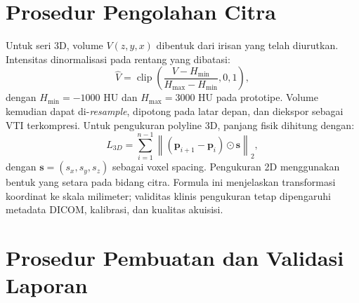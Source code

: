 \documentclass[12pt,a4paper,oneside]{report}
\begin{document}
\section{Prosedur Pengolahan Citra}

Untuk seri 3D, volume $V(z,y,x)$ dibentuk dari irisan yang telah diurutkan. Intensitas dinormalisasi pada rentang yang dibatasi:
\begin{equation}
\hat{V}=\operatorname{clip}\left(\frac{V-H_{\min}}{H_{\max}-H_{\min}},0,1\right),
\end{equation}
dengan $H_{\min}=-1000$ HU dan $H_{\max}=3000$ HU pada prototipe. Volume kemudian dapat di-\textit{resample}, dipotong pada latar depan, dan diekspor sebagai VTI terkompresi. Untuk pengukuran polyline 3D, panjang fisik dihitung dengan:
\begin{equation}
L_{3D}=\sum_{i=1}^{n-1}\left\|(\mathbf{p}_{i+1}-\mathbf{p}_{i})\odot\mathbf{s}\right\|_2,
\end{equation}
dengan $\mathbf{s}=(s_x,s_y,s_z)$ sebagai voxel spacing. Pengukuran 2D menggunakan bentuk yang setara pada bidang citra. Formula ini menjelaskan transformasi koordinat ke skala milimeter; validitas klinis pengukuran tetap dipengaruhi metadata DICOM, kalibrasi, dan kualitas akuisisi.

\section{Prosedur Pembuatan dan Validasi Laporan}
\end{document}
